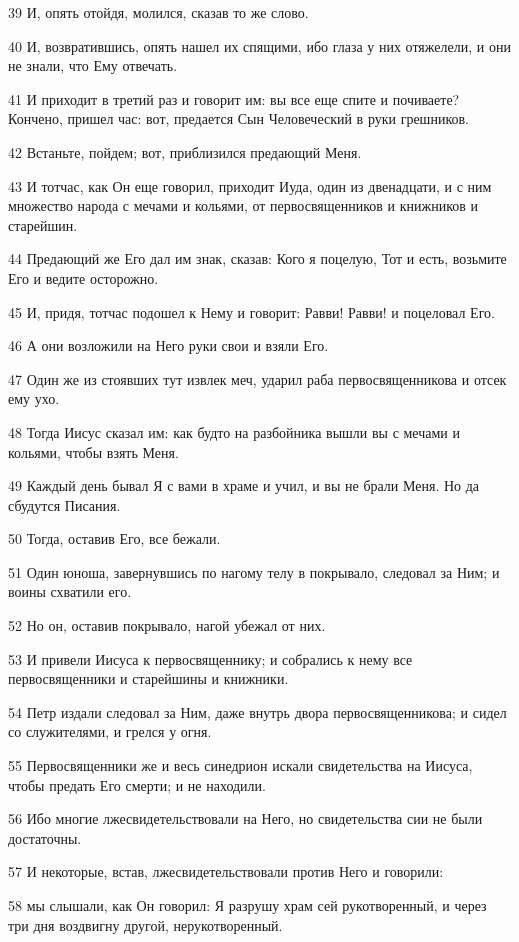 \par 39 И, опять отойдя, молился, сказав то же слово.
\par 40 И, возвратившись, опять нашел их спящими, ибо глаза у них отяжелели, и они не знали, что Ему отвечать.
\par 41 И приходит в третий раз и говорит им: вы все еще спите и почиваете? Кончено, пришел час: вот, предается Сын Человеческий в руки грешников.
\par 42 Встаньте, пойдем; вот, приблизился предающий Меня.
\par 43 И тотчас, как Он еще говорил, приходит Иуда, один из двенадцати, и с ним множество народа с мечами и кольями, от первосвященников и книжников и старейшин.
\par 44 Предающий же Его дал им знак, сказав: Кого я поцелую, Тот и есть, возьмите Его и ведите осторожно.
\par 45 И, придя, тотчас подошел к Нему и говорит: Равви! Равви! и поцеловал Его.
\par 46 А они возложили на Него руки свои и взяли Его.
\par 47 Один же из стоявших тут извлек меч, ударил раба первосвященникова и отсек ему ухо.
\par 48 Тогда Иисус сказал им: как будто на разбойника вышли вы с мечами и кольями, чтобы взять Меня.
\par 49 Каждый день бывал Я с вами в храме и учил, и вы не брали Меня. Но да сбудутся Писания.
\par 50 Тогда, оставив Его, все бежали.
\par 51 Один юноша, завернувшись по нагому телу в покрывало, следовал за Ним; и воины схватили его.
\par 52 Но он, оставив покрывало, нагой убежал от них.
\par 53 И привели Иисуса к первосвященнику; и собрались к нему все первосвященники и старейшины и книжники.
\par 54 Петр издали следовал за Ним, даже внутрь двора первосвященникова; и сидел со служителями, и грелся у огня.
\par 55 Первосвященники же и весь синедрион искали свидетельства на Иисуса, чтобы предать Его смерти; и не находили.
\par 56 Ибо многие лжесвидетельствовали на Него, но свидетельства сии не были достаточны.
\par 57 И некоторые, встав, лжесвидетельствовали против Него и говорили:
\par 58 мы слышали, как Он говорил: Я разрушу храм сей рукотворенный, и через три дня воздвигну другой, нерукотворенный.
